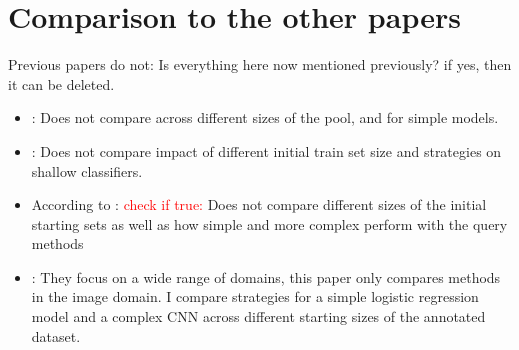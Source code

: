 \documentclass{article}
\theoremstyle{plain}
\theoremstyle{definition}
\theoremstyle{remark}
\begin{document}
\section{Comparison to the other papers}
Previous papers do not: Is everything here now mentioned previously? if yes, then it can be deleted.
\begin{itemize}
	\item \cite{schröder_revisitinguncertaintybasedquerystrategies}: Does not compare across different sizes of the pool, and for simple models.
	\item \cite{comparativesurveydeepactive}: Does not compare impact of different initial train set size and strategies on shallow classifiers.
	
	\item According to \cite{ueno_benchmarkingofquerystrategies}: \textcolor{red}{check if true:} Does not compare different sizes of the initial starting sets as well as how simple and more complex perform with the query methods
	
	\item \cite{werner_comparableactivelearning}: They focus on a wide range of domains, this paper only compares methods in the image domain. I compare strategies for a simple logistic regression model and a complex CNN across different starting sizes of the annotated dataset. \\
\end{itemize}



\end{document}
